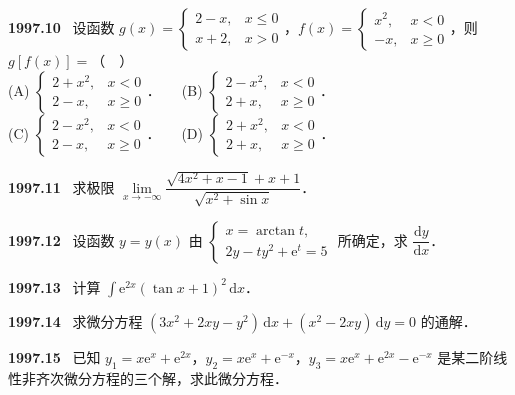 \documentclass[UTF8,12pt]{ctexart}
\newcommand{\qn}[1]{\textbf{\large #1}\ }
\begin{document}
\vfill
\newpage
\qn{1997.10}
设函数 $g(x)=\begin{cases} 2-x, & x\leqslant 0\\ x+2, & x>0 \end{cases}$，$f(x)=\begin{cases} x^2, & x<0\\ -x, & x\geqslant 0 \end{cases}$，则 $g[f(x)]=$（　）
\\
\noindent (A) $\begin{cases} 2+x^2, & x<0\\ 2-x, & x\geqslant 0 \end{cases}$．　　(B) $\begin{cases} 2-x^2, & x<0\\ 2+x, & x\geqslant 0 \end{cases}$．
\\
\noindent (C) $\begin{cases} 2-x^2, & x<0\\ 2-x, & x\geqslant 0 \end{cases}$．　　(D) $\begin{cases} 2+x^2, & x<0\\ 2+x, & x\geqslant 0 \end{cases}$．

\vfill
\newpage
\qn{1997.11}
求极限 $\lim\limits_{x\to-\infty}\dfrac{\sqrt{4x^2+x-1}+x+1}{\sqrt{x^2+\sin x}}$．

\vfill
\newpage
\qn{1997.12}
设函数 $y=y(x)$ 由 $\begin{cases} x=\arctan t,\\ 2y-ty^2+\mathrm{e}^t=5 \end{cases}$ 所确定，求 $\dfrac{\mathrm{d}y}{\mathrm{d}x}$．

\vfill
\newpage
\qn{1997.13}
计算 $\displaystyle\int\mathrm{e}^{2x}(\tan x+1)^2\,\mathrm{d}x$．

\vfill
\newpage
\qn{1997.14}
求微分方程 $(3x^2+2xy-y^2)\,\mathrm{d}x+(x^2-2xy)\,\mathrm{d}y=0$ 的通解．

\vfill
\newpage
\qn{1997.15}
已知 $y_1=x\mathrm{e}^x+\mathrm{e}^{2x}$，$y_2=x\mathrm{e}^x+\mathrm{e}^{-x}$，$y_3=x\mathrm{e}^x+\mathrm{e}^{2x}-\mathrm{e}^{-x}$ 是某二阶线性非齐次微分方程的三个解，求此微分方程．
\end{document}
